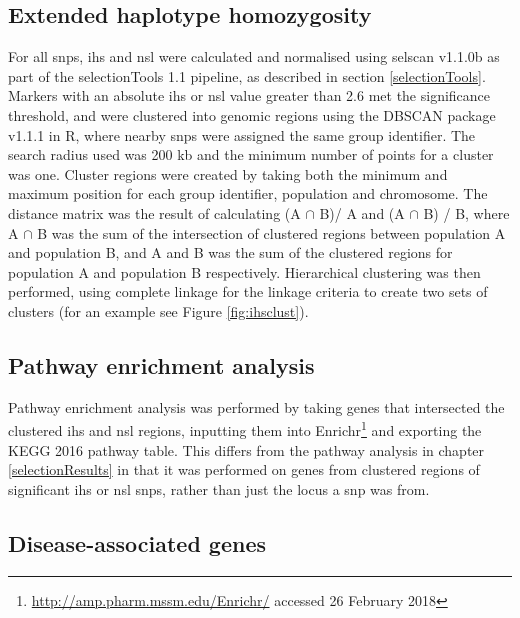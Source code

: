 \documentclass[twoside,openright]{report}
\begin{document}
\subsection{Extended haplotype homozygosity}\label{haplocluster}

For all \glspl{snp}, \gls{ihs} and \gls{nsl} were calculated and
normalised using selscan v1.1.0b \citep{Szpiech2014} as part of the
selectionTools 1.1 \citep{Cadzow2014} pipeline, as described in section
\ref{selectionTools}. Markers with an absolute \gls{ihs} or \gls{nsl}
value greater than 2.6 met the significance threshold, and were
clustered into genomic regions using the DBSCAN package v1.1.1
\citep{dbscanref} in R, where nearby \glspl{snp} were assigned the same
group identifier. The search radius used was 200 kb and the minimum
number of points for a cluster was one. Cluster regions were created by
taking both the minimum and maximum position for each group identifier,
population and chromosome. The distance matrix was the result of
calculating (A \(\cap\) B)/ A and (A \(\cap\) B) / B, where A \(\cap\) B
was the sum of the intersection of clustered regions between population
A and population B, and A and B was the sum of the clustered regions for
population A and population B respectively. Hierarchical clustering was
then performed, using complete linkage for the linkage criteria to
create two sets of clusters (for an example see Figure
\ref{fig:ihsclust}).

\subsection{Pathway enrichment
analysis}\label{pathway-enrichment-analysis-1}

Pathway enrichment analysis was performed by taking genes that
intersected the clustered \gls{ihs} and \gls{nsl} regions, inputting
them into Enrichr\footnote{\url{http://amp.pharm.mssm.edu/Enrichr/}
  accessed 26 February 2018} \citep{Chen2013b, Kuleshov2016} and
exporting the KEGG 2016 pathway table. This differs from the pathway
analysis in chapter \ref{selectionResults} in that it was performed on
genes from clustered regions of significant \gls{ihs} or \gls{nsl}
\glspl{snp}, rather than just the locus a \gls{snp} was from.

\subsection{Disease-associated genes}\label{disease-associated-genes}
\end{document}
